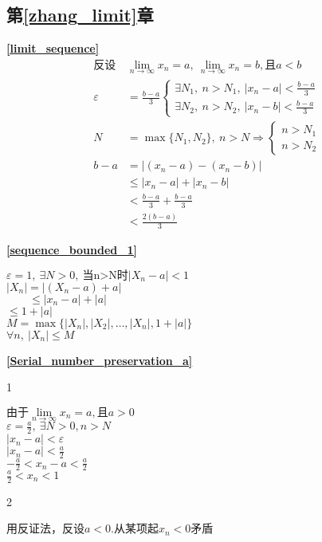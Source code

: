 \subsection{\centering 第\ref{zhang_limit}章}
\textbf{\large \ref{limit_sequence}}
\begin{displaymath}
    \begin{split}
        \mbox{反设}&\lim\limits_{n \to \infty}x_n =a,\ \lim\limits_{n \to \infty}x_n =b,\mbox{且}a<b\\
        \varepsilon&=\frac{b-a}{3}\begin{cases}
            \exists N_1,\ n>N_1,\ \left|x_n-a\right|<\frac{b-a}{3}\\
            \exists N_2,\ n>N_2,\ \left|x_n-b\right|<\frac{b-a}{3}
        \end{cases}\\
        N&=\max\{N_1,N_2\},\ n>N\Rightarrow\begin{cases}
            n>N_1\\
            n>N_2
        \end{cases}\\
        b-a&=\left|(x_n-a)-(x_n-b)\right|\\
        &\leqslant \left|x_n-a\right|+\left|x_n-b\right|\\
        &<\frac{b-a}{3}+\frac{b-a}{3}\\
        &<\frac{2(b-a)}{3}
    \end{split}
\end{displaymath}

\textbf{\large \ref{sequence_bounded_1}}
    \begin{center}
       $\varepsilon =1,\ \exists N>0,\ \mbox{当n>N时}\left|X_n-a\right|<1$\\
        $\left|X_n\right|=\left|(X_n-a)+a\right|$\\
        $\qquad\leqslant \left|x_n-a\right|+\left|a\right|$\\
        $\leqslant 1+\left|a\right|$\\
        $M=\max\{\left|X_n\right|,\left|X_2\right|,\dots,\left|X_n\right|,1+\left|a\right|\}$\\
        $\forall n,\ \left|X_n\right|\leqslant M$
    \end{center}
\textbf{\large \ref{Serial_number_preservation_a}}
    \begin{center}1\end{center}
    $\mbox{由于}\lim\limits_{n\to\infty}x_n = a,\mbox{且}a>0$\\
    $\varepsilon = \frac{a}{2},\ \exists N>0,n>N$\\
    $\left|x_n-a\right|<\varepsilon$\\
    $\left|x_n-a\right|<\frac{a}{2}$\\
    $-\frac{a}{2}<x_n-a<\frac{a}{2}$\\
    $\frac{a}{2}<x_n<1$
    \begin{center}2\end{center}
    用反证法，反设$a<0$.从某项起$x_n<0$矛盾

